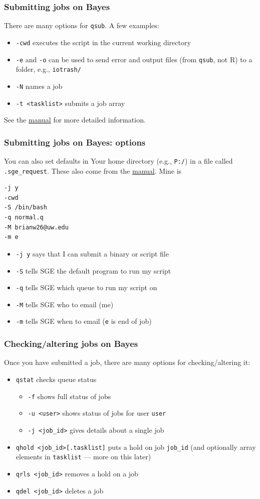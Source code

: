 \documentclass[12pt, 
hyperref={colorlinks=true, linkcolor=blue, urlcolor=cyan}]{beamer}
\newcommand{\myframe}[1]{\begin{frame} \frametitle{#1}}
\begin{document}
\myframe{Submitting jobs on Bayes}
There are many options for \texttt{qsub}. A few examples:
\begin{itemize}
\item \texttt{-cwd} executes the script in the current working directory
\item \texttt{-e} and \texttt{-o} can be used to send error and output files (from \texttt{qsub}, not R) to a folder, e.g., \texttt{iotrash/}
\item \texttt{-N} names a job
\item \texttt{-t <tasklist>} submits a job array
\end{itemize}

See the \href{http://gridscheduler.sourceforge.net/htmlman/htmlman1/qsub.html}{manual} for more detailed information. 
\end{frame}

\begin{frame}[fragile]
\frametitle{Submitting jobs on Bayes: options}
You can also set defaults in Your home directory (e.g., \texttt{P:/}) in a file called \texttt{.sge\_request}. These also come from the \href{http://gridscheduler.sourceforge.net/htmlman/htmlman1/qsub.html}{manual}. Mine is
\begin{verbatim}
-j y
-cwd
-S /bin/bash
-q normal.q
-M brianw26@uw.edu
-m e
\end{verbatim}

\begin{itemize}
\item \texttt{-j y} says that I can submit a binary or script file
\item \texttt{-S} tells SGE the default program to run my script
\item \texttt{-q} tells SGE which queue to run my script on
\item \texttt{-M} tells SGE who to email (me)
\item \texttt{-m} tells SGE when to email (\texttt{e} is end of job)
\end{itemize}
\end{frame}

\myframe{Checking/altering jobs on Bayes}
Once you have submitted a job, there are many options for checking/altering it:
\begin{itemize}
\item \texttt{qstat} checks queue status
\begin{itemize}
\item \texttt{-f} shows full status of jobs
\item \texttt{-u <user>} shows status of jobs for user \texttt{user}
\item \texttt{-j <job\_id>} gives details about a single job
\end{itemize}
\item \texttt{qhold <job\_id>[.tasklist]} puts a hold on job \texttt{job\_id} (and optionally array elements in \texttt{tasklist} --- more on this later)
\item \texttt{qrls <job\_id>} removes a hold on a job
\item \texttt{qdel <job\_id>} deletes a job
\end{itemize}
\end{frame}
\end{document}
